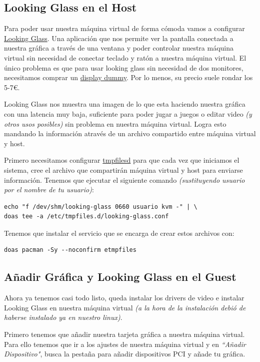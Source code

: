 \documentclass[12pt]{article}
\begin{document}
\subsection{Looking Glass en el Host}

Para poder usar nuestra máquina virtual de forma cómoda vamos a configurar \href{https://looking-glass.io/}{Looking Glass}. Una aplicación que nos permite ver la pantalla conectada a nuestra gráfica a través de una ventana y poder controlar nuestra máquina virtual sin necesidad de conectar teclado y ratón a nuestra máquina virtual. El único problema es que para usar looking glass sin necesidad de dos monitores, necesitamos comprar un \href{https://www.amazon.com/s?k=display+dummy}{display dummy}. Por lo menos, su precio suele rondar los 5-7€.

Looking Glass nos muestra una imagen de lo que esta haciendo nuestra gráfica con una latencia muy baja, suficiente para poder jugar a juegos o editar video \emph{(y otros usos posibles)} sin problema en nuestra máquina virtual. Logra esto mandando la información através de un archivo compartido entre máquina virtual y host.

Primero necesitamos configurar \href{dsada}{tmpfilesd} para que cada vez que iniciamos el sistema, cree el archivo que compartirán máquina virtual y host para enviarse información. Tenemos que ejecutar el siguiente comando \emph{(sustituyendo usuario por el nombre de tu usuario)}:

\begin{verbatim}
echo "f /dev/shm/looking-glass 0660 usuario kvm -" | \
doas tee -a /etc/tmpfiles.d/looking-glass.conf
\end{verbatim}

Tenemos que instalar el servicio que se encarga de crear estos archivos con:

\begin{verbatim}
doas pacman -Sy --noconfirm etmpfiles
\end{verbatim}

\subsection{Añadir Gráfica y Looking Glass en el Guest}

Ahora ya tenemos casi todo listo, queda instalar los drivers de video e instalar Looking Glass en nuestra máquina virtual \emph{(a la hora de la instalación debió de haberse instalado ya en nuestro linux)}.

Primero tenemos que añadir nuestra tarjeta gráfica a nuestra máquina virtual. Para ello tenemos que ir a los ajustes de nuestra máquina virtual y en \emph{``Añadir Dispositivo"}, busca la pestaña para añadir dispositivos PCI y añade tu gráfica.
\end{document}
